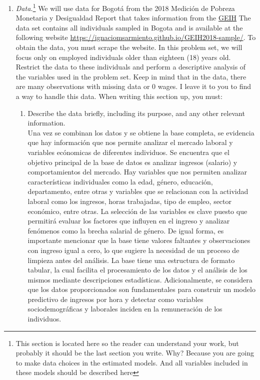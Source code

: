 \documentclass[12pt,a4paper,onecolumn]{article}
\begin{document}
\begin{enumerate}
    \item \textit{Data.}\footnote{This section is located here so the reader can understand your work, but probably it should be the last section you write. Why? Because you are going to make data choices in the estimated models. And all variables included in these models should be described here} We will use data for Bogot\'a from the 2018 Medici\'on de Pobreza Monetaria y Desigualdad Report that takes information from the \href{https://www.dane.gov.co/index.php/estadisticas-por-tema/mercado-laboral/empleo-y-desempleo/geih-historicos}{GEIH}
    The data set contains all individuals sampled in Bogota and is available at the following website \url {https://ignaciomsarmiento.github.io/GEIH2018-sample/}. To obtain the data, you must scrape the website. In this problem set, we will focus only on employed individuals older than eighteen (18) years old. Restrict the data to these individuals and perform a descriptive analysis of the variables used in the problem set. Keep in mind that in the data, there are many observations with missing data or 0 wages. I leave it to you to find a way to handle this data.
    When writing this section up, you must:

\begin{enumerate}
    \item Describe the data briefly, including its purpose, and any other relevant information. \\
    
    Una vez se combinan los datos y se obtiene la base completa, se evidencia que hay informaci\'on que nos permite analizar el mercado laboral y variables ec\'onomicas de diferentes individuos. Se encuentra que el objetivo principal de la base de datos es analizar ingresos (salario) y comportamientos del mercado. Hay variables que nos permiten analizar caracter\'isticas individuales como la edad, g\'enero, educaci\'on, departamento, entre otras y variables que se relacionan con la actividad laboral como los ingresos, horas trabajadas, tipo de empleo, sector econ\'omico, entre otras. La selecci\'on de las variables es clave puesto que permitir\'a evaluar los factores que influyen en el ingreso y analizar fen\'omenos como la brecha salarial de g\'enero. De igual forma, es importante mencionar que la base tiene valores faltantes y observaciones con ingreso igual a cero, lo que sugiere la necesidad de un proceso de limpieza antes del an\'alisis. La base tiene una estructura de formato tabular, la cual facilita el procesamiento de los datos y el an\'alisis de los mismos mediante descripciones estad\'isticas. Adicionalmente, se considera que los datos proporcionados son fundamentales para construir un modelo predictivo de ingresos por hora y detectar como variables sociodemogr\'aficas y laborales inciden en la remuneraci\'on de los individuos.


\end{enumerate}
\end{enumerate}
\end{document}
